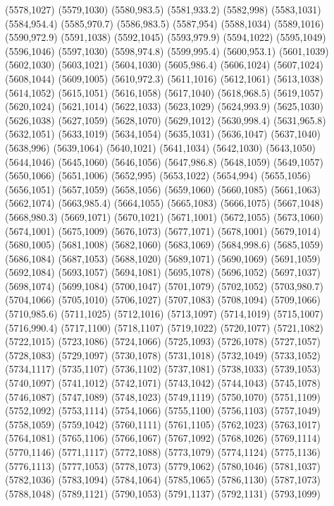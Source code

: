 (5578,1027)
(5579,1030)
(5580,983.5)
(5581,933.2)
(5582,998)
(5583,1031)
(5584,954.4)
(5585,970.7)
(5586,983.5)
(5587,954)
(5588,1034)
(5589,1016)
(5590,972.9)
(5591,1038)
(5592,1045)
(5593,979.9)
(5594,1022)
(5595,1049)
(5596,1046)
(5597,1030)
(5598,974.8)
(5599,995.4)
(5600,953.1)
(5601,1039)
(5602,1030)
(5603,1021)
(5604,1030)
(5605,986.4)
(5606,1024)
(5607,1024)
(5608,1044)
(5609,1005)
(5610,972.3)
(5611,1016)
(5612,1061)
(5613,1038)
(5614,1052)
(5615,1051)
(5616,1058)
(5617,1040)
(5618,968.5)
(5619,1057)
(5620,1024)
(5621,1014)
(5622,1033)
(5623,1029)
(5624,993.9)
(5625,1030)
(5626,1038)
(5627,1059)
(5628,1070)
(5629,1012)
(5630,998.4)
(5631,965.8)
(5632,1051)
(5633,1019)
(5634,1054)
(5635,1031)
(5636,1047)
(5637,1040)
(5638,996)
(5639,1064)
(5640,1021)
(5641,1034)
(5642,1030)
(5643,1050)
(5644,1046)
(5645,1060)
(5646,1056)
(5647,986.8)
(5648,1059)
(5649,1057)
(5650,1066)
(5651,1006)
(5652,995)
(5653,1022)
(5654,994)
(5655,1056)
(5656,1051)
(5657,1059)
(5658,1056)
(5659,1060)
(5660,1085)
(5661,1063)
(5662,1074)
(5663,985.4)
(5664,1055)
(5665,1083)
(5666,1075)
(5667,1048)
(5668,980.3)
(5669,1071)
(5670,1021)
(5671,1001)
(5672,1055)
(5673,1060)
(5674,1001)
(5675,1009)
(5676,1073)
(5677,1071)
(5678,1001)
(5679,1014)
(5680,1005)
(5681,1008)
(5682,1060)
(5683,1069)
(5684,998.6)
(5685,1059)
(5686,1084)
(5687,1053)
(5688,1020)
(5689,1071)
(5690,1069)
(5691,1059)
(5692,1084)
(5693,1057)
(5694,1081)
(5695,1078)
(5696,1052)
(5697,1037)
(5698,1074)
(5699,1084)
(5700,1047)
(5701,1079)
(5702,1052)
(5703,980.7)
(5704,1066)
(5705,1010)
(5706,1027)
(5707,1083)
(5708,1094)
(5709,1066)
(5710,985.6)
(5711,1025)
(5712,1016)
(5713,1097)
(5714,1019)
(5715,1007)
(5716,990.4)
(5717,1100)
(5718,1107)
(5719,1022)
(5720,1077)
(5721,1082)
(5722,1015)
(5723,1086)
(5724,1066)
(5725,1093)
(5726,1078)
(5727,1057)
(5728,1083)
(5729,1097)
(5730,1078)
(5731,1018)
(5732,1049)
(5733,1052)
(5734,1117)
(5735,1107)
(5736,1102)
(5737,1081)
(5738,1033)
(5739,1053)
(5740,1097)
(5741,1012)
(5742,1071)
(5743,1042)
(5744,1043)
(5745,1078)
(5746,1087)
(5747,1089)
(5748,1023)
(5749,1119)
(5750,1070)
(5751,1109)
(5752,1092)
(5753,1114)
(5754,1066)
(5755,1100)
(5756,1103)
(5757,1049)
(5758,1059)
(5759,1042)
(5760,1111)
(5761,1105)
(5762,1023)
(5763,1017)
(5764,1081)
(5765,1106)
(5766,1067)
(5767,1092)
(5768,1026)
(5769,1114)
(5770,1146)
(5771,1117)
(5772,1088)
(5773,1079)
(5774,1124)
(5775,1136)
(5776,1113)
(5777,1053)
(5778,1073)
(5779,1062)
(5780,1046)
(5781,1037)
(5782,1036)
(5783,1094)
(5784,1064)
(5785,1065)
(5786,1130)
(5787,1073)
(5788,1048)
(5789,1121)
(5790,1053)
(5791,1137)
(5792,1131)
(5793,1099)
